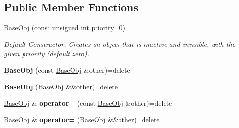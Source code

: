 \subsection*{Public Member Functions}
\begin{DoxyCompactItemize}
\item 
\hypertarget{class_helios_1_1_base_obj_ad77bdec51d537c1bfc9661b728980498}{}\hyperlink{class_helios_1_1_base_obj_ad77bdec51d537c1bfc9661b728980498}{Base\+Obj} (const unsigned int priority=0)\label{class_helios_1_1_base_obj_ad77bdec51d537c1bfc9661b728980498}

\begin{DoxyCompactList}\small\item\em Default Constructor. Creates an object that is inactive and invisible, with the given priority (default zero). \end{DoxyCompactList}\item 
\hypertarget{class_helios_1_1_base_obj_aa278e49125c0c84d26906ae47cfff727}{}{\bfseries Base\+Obj} (const \hyperlink{class_helios_1_1_base_obj}{Base\+Obj} \&other)=delete\label{class_helios_1_1_base_obj_aa278e49125c0c84d26906ae47cfff727}

\item 
\hypertarget{class_helios_1_1_base_obj_ad2127aa4f505b6183a9d91d384062b98}{}{\bfseries Base\+Obj} (\hyperlink{class_helios_1_1_base_obj}{Base\+Obj} \&\&other)=delete\label{class_helios_1_1_base_obj_ad2127aa4f505b6183a9d91d384062b98}

\item 
\hypertarget{class_helios_1_1_base_obj_a499a49d6f7f7f79190e6d598eab4391e}{}\hyperlink{class_helios_1_1_base_obj}{Base\+Obj} \& {\bfseries operator=} (const \hyperlink{class_helios_1_1_base_obj}{Base\+Obj} \&other)=delete\label{class_helios_1_1_base_obj_a499a49d6f7f7f79190e6d598eab4391e}

\item 
\hypertarget{class_helios_1_1_base_obj_ab588e3ffe972a53de418f50558651f2f}{}\hyperlink{class_helios_1_1_base_obj}{Base\+Obj} \& {\bfseries operator=} (\hyperlink{class_helios_1_1_base_obj}{Base\+Obj} \&\&other)=delete\label{class_helios_1_1_base_obj_ab588e3ffe972a53de418f50558651f2f}


\end{DoxyCompactItemize}
